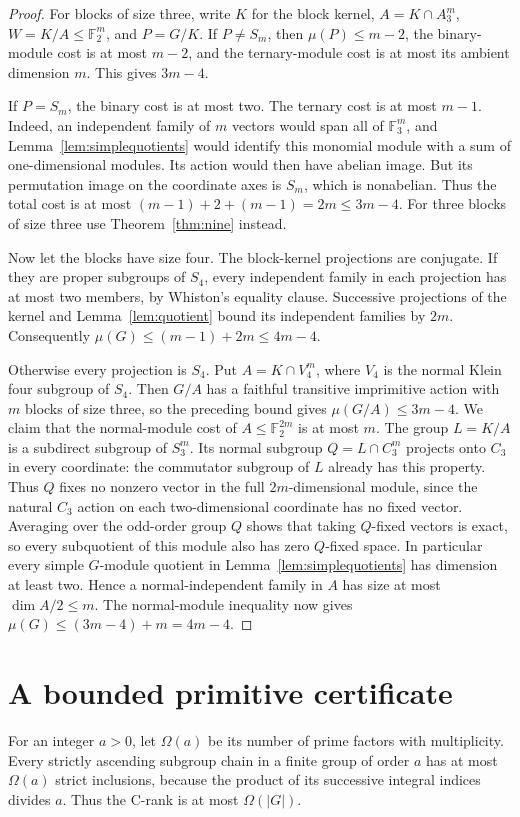 \begin{proof}
For blocks of size three, write $K$ for the block kernel,
$A=K\cap A_3^m$, $W=K/A\leq\mathbb F_2^m$, and $P=G/K$.
If $P\ne S_m$, then $\mu(P)\leq m-2$, the binary-module cost
is at most $m-2$, and the ternary-module cost is at most its
ambient dimension $m$. This gives $3m-4$.

If $P=S_m$, the binary cost is at most two. The ternary cost is at
most $m-1$. Indeed, an independent family of $m$ vectors would span
all of $\mathbb F_3^m$, and Lemma~\ref{lem:simplequotients} would
identify this monomial module with a sum of one-dimensional modules.
Its action would then have abelian image. But its permutation image
on the coordinate axes is $S_m$, which is nonabelian. Thus the total
cost is at most $(m-1)+2+(m-1)=2m\leq3m-4$.
For three blocks of size three use Theorem~\ref{thm:nine} instead.

Now let the blocks have size four. The block-kernel projections are
conjugate. If they are proper subgroups of $S_4$, every independent
family in each projection has at most two members, by Whiston's
equality clause. Successive projections of the kernel and
Lemma~\ref{lem:quotient} bound its independent families by $2m$.
Consequently $\mu(G)\leq(m-1)+2m\leq4m-4$.

Otherwise every projection is $S_4$. Put $A=K\cap V_4^m$, where
$V_4$ is the normal Klein four subgroup of $S_4$. Then $G/A$ has a
faithful transitive imprimitive action with $m$ blocks of size three,
so the preceding bound gives $\mu(G/A)\leq3m-4$.
We claim that the normal-module cost of $A\leq\mathbb F_2^{2m}$
is at most $m$. The group $L=K/A$ is a subdirect subgroup of $S_3^m$.
Its normal subgroup $Q=L\cap C_3^m$ projects onto $C_3$ in every
coordinate: the commutator subgroup of $L$ already has this property.
Thus $Q$ fixes no nonzero vector in the full $2m$-dimensional module,
since the natural $C_3$ action on each two-dimensional coordinate
has no fixed vector. Averaging over the odd-order group $Q$ shows
that taking $Q$-fixed vectors is exact, so every subquotient of this
module also has zero $Q$-fixed space. In particular every simple
$G$-module quotient in Lemma~\ref{lem:simplequotients} has dimension
at least two. Hence a normal-independent family in $A$ has size
at most $\dim A/2\leq m$. The normal-module inequality now gives
$\mu(G)\leq(3m-4)+m=4m-4$.
\end{proof}

\section{A bounded primitive certificate}
For an integer $a>0$, let $\Omega(a)$ be its number of prime factors
with multiplicity. Every strictly ascending subgroup chain in a finite
group of order $a$ has at most $\Omega(a)$ strict inclusions, because
the product of its successive integral indices divides $a$. Thus the
C-rank is at most $\Omega(|G|)$.

